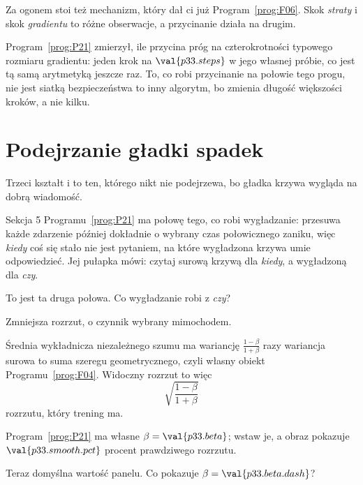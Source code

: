 \begin{fr}
Za ogonem stoi też mechanizm, który dał ci już Program~\ref{prog:F06}. Skok
\emph{straty} i skok \emph{gradientu} to różne obserwacje, a przycinanie
działa na drugim.

Program~\ref{prog:P21} zmierzył, ile przycina próg na czterokrotności typowego
rozmiaru gradientu: jeden krok na $\val{p33.steps}$ w jego własnej próbie, co
jest tą samą arytmetyką jeszcze raz. To, co robi przycinanie na połowie tego
progu, nie jest siatką bezpieczeństwa \dash{} to inny algorytm, bo zmienia
długość większości kroków, a nie kilku.
\end{fr}

\section{Podejrzanie gładki spadek}
\label{sec:P33-smooth}

\begin{fr}
Trzeci kształt i to ten, którego nikt nie podejrzewa, bo gładka krzywa wygląda
na dobrą wiadomość.

Sekcja 5 Programu~\ref{prog:P21} ma połowę tego, co robi wygładzanie:
przesuwa każde zdarzenie później dokładnie o wybrany czas połowicznego zaniku,
więc \emph{kiedy} coś się stało nie jest pytaniem, na które wygładzona krzywa
umie odpowiedzieć. Jej pułapka mówi: czytaj surową krzywą dla \emph{kiedy}, a
wygładzoną dla \emph{czy}.

To jest ta druga połowa. Co wygładzanie robi z \emph{czy}?
\dotline
\nextframe
\end{fr}

\begin{fr}
\begin{ansblock}
Zmniejsza rozrzut, o czynnik wybrany mimochodem.

Średnia wykładnicza niezależnego szumu ma wariancję
$\frac{1-\beta}{1+\beta}$ razy wariancja surowa \dash{} to suma szeregu
geometrycznego, czyli własny obiekt Programu~\ref{prog:F04}. Widoczny rozrzut
to więc
\[ \sqrt{\frac{1-\beta}{1+\beta}} \]
rozrzutu, który trening ma.
\end{ansblock}
\end{fr}

\begin{fr}
Program~\ref{prog:P21} ma własne $\beta = \val{p33.beta}$; wstaw je, a
obraz pokazuje $\val{p33.smooth.pct}$ procent prawdziwego rozrzutu.

Teraz domyślna wartość panelu. Co pokazuje $\beta = \val{p33.beta.dash}$?
\dotline
\nextframe
\end{fr}

